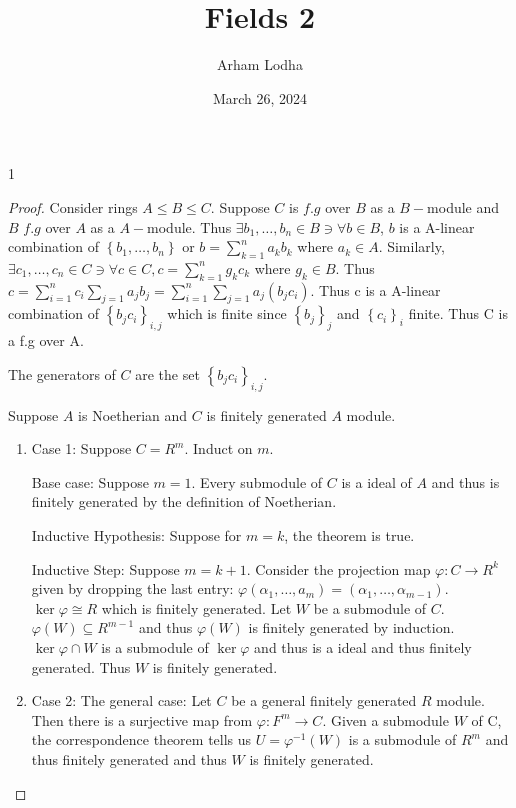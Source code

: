 \documentclass{article}
\begin{document}
\title{Fields 2}
\author{Arham Lodha}%
\date{March 26, 2024}%
\maketitle

\begin{PROB}{1}\label{Problem 1.}
\end{PROB}
\begin{proof}
    Consider rings $A \leq B \leq C$. Suppose $C$ is $f.g$ over $B$ as a $B-$module and $B$ $f.g$ over $A$ as a $A-$module. Thus $\exists b_1, \dots, b_n \in B \ni \forall b \in B$, $b$ is a A-linear combination of $\left\{ b_1, \dots, b_n \right\}$ or $b = \sum_{k = 1}^{n}a_k b_k$ where $a_k \in A$. Similarly, $\exists c_1, \dots, c_n \in C \ni \forall c \in C, c = \sum_{k = 1}^{n} g_k c_k$ where $g_k \in B$. Thus $c = \sum_{i = 1}^{n} c_i \sum_{j = 1} a_j b_j = \sum_{i = 1}^{n}  \sum_{j = 1} a_j (b_j c_i)$. Thus c is a A-linear combination of $\left\{ b_jc_i \right\}_{i,j}$ which is finite since $\left\{ b_j \right\}_j$ and $\left\{ c_i \right\}_i$ finite. Thus C is a f.g over A. 

    The generators of $C$ are the set $\left\{ b_j c_i \right\}_{i, j}$. 
    
    Suppose $A$ is Noetherian and $C$ is finitely generated $A$ module.
    
    \begin{enumerate}
        \item Case 1: Suppose $C = R^m$. Induct on $m$. 
        
        Base case: Suppose $m = 1$. Every submodule of $C$ is a ideal of $A$ and thus is finitely generated by the definition of Noetherian. 
        
        Inductive Hypothesis: Suppose for $m = k$, the theorem is true. 
        
        Inductive Step: Suppose $m = k + 1$. Consider the projection map $\varphi: C \to R^{k}$ given by dropping the last entry: $\varphi(\alpha_1, \dots, a_m) = (\alpha_1, \dots, \alpha_{m - 1})$. $\ker \varphi \cong  R$ which is finitely generated. Let $W$ be a submodule of $C$. $\varphi(W) \subseteq R^{m - 1}$ and thus $\varphi(W)$ is finitely generated by induction. $\ker \varphi \cap W$ is a submodule of $\ker \varphi$ and thus is a ideal and thus finitely generated. Thus $W$ is finitely generated.
        
        \item Case 2: The general case: Let $C$ be a general finitely generated $R$ module. Then there is a surjective map from $\varphi : F^m \to C$. Given a submodule $W$ of C, the correspondence theorem tells us $U = \varphi^{-1}(W)$ is a submodule of $R^m$ and thus finitely generated and thus $W$ is finitely generated.        
    \end{enumerate}


\end{proof}
\end{document}
